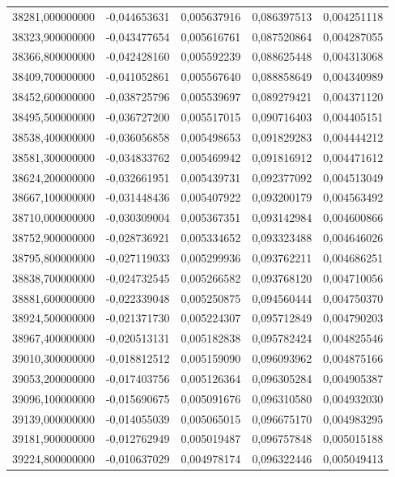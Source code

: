 \begin{longtable}{rrrrr}
38281,000000000 & -0,044653631 & 0,005637916 & 0,086397513 & 0,004251118\\
38323,900000000 & -0,043477654 & 0,005616761 & 0,087520864 & 0,004287055\\
38366,800000000 & -0,042428160 & 0,005592239 & 0,088625448 & 0,004313068\\
38409,700000000 & -0,041052861 & 0,005567640 & 0,088858649 & 0,004340989\\
38452,600000000 & -0,038725796 & 0,005539697 & 0,089279421 & 0,004371120\\
38495,500000000 & -0,036727200 & 0,005517015 & 0,090716403 & 0,004405151\\
38538,400000000 & -0,036056858 & 0,005498653 & 0,091829283 & 0,004444212\\
38581,300000000 & -0,034833762 & 0,005469942 & 0,091816912 & 0,004471612\\
38624,200000000 & -0,032661951 & 0,005439731 & 0,092377092 & 0,004513049\\
38667,100000000 & -0,031448436 & 0,005407922 & 0,093200179 & 0,004563492\\
38710,000000000 & -0,030309004 & 0,005367351 & 0,093142984 & 0,004600866\\
38752,900000000 & -0,028736921 & 0,005334652 & 0,093323488 & 0,004646026\\
38795,800000000 & -0,027119033 & 0,005299936 & 0,093762211 & 0,004686251\\
38838,700000000 & -0,024732545 & 0,005266582 & 0,093768120 & 0,004710056\\
38881,600000000 & -0,022339048 & 0,005250875 & 0,094560444 & 0,004750370\\
38924,500000000 & -0,021371730 & 0,005224307 & 0,095712849 & 0,004790203\\
38967,400000000 & -0,020513131 & 0,005182838 & 0,095782424 & 0,004825546\\
39010,300000000 & -0,018812512 & 0,005159090 & 0,096093962 & 0,004875166\\
39053,200000000 & -0,017403756 & 0,005126364 & 0,096305284 & 0,004905387\\
39096,100000000 & -0,015690675 & 0,005091676 & 0,096310580 & 0,004932030\\
39139,000000000 & -0,014055039 & 0,005065015 & 0,096675170 & 0,004983295\\
39181,900000000 & -0,012762949 & 0,005019487 & 0,096757848 & 0,005015188\\
39224,800000000 & -0,010637029 & 0,004978174 & 0,096322446 & 0,005049413\\

\end{longtable}
